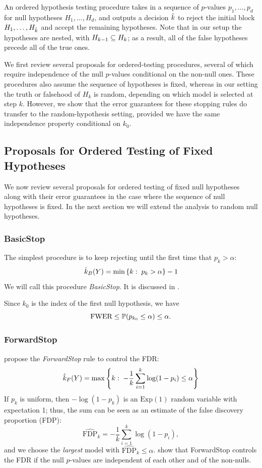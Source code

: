\documentclass{article}
\begin{document}
An ordered hypothesis testing procedure takes in a sequence of $p$-values $p_1, \ldots, p_d$ for null hypotheses $H_{1}, \ldots, H_{d}$, and outputs a decision $\hk$ to reject the initial block $H_{1}, \ldots, H_{\hk}$ and accept the remaining hypotheses. Note that in our setup the hypotheses are nested, with $H_{k-1} \sub H_k$; as a result, all of the false hypotheses precede all of the true ones.

We first review several proposals for ordered-testing procedures, several of which require independence of the null $p$-values conditional on the non-null ones. These procedures also assume the sequence of hypotheses is fixed, whereas in our setting the truth or falsehood of $H_k$ is random, depending on which model is selected at step $k$. However, we show that the error guarantees for these stopping rules do transfer to the random-hypothesis setting, provided we have the same independence property conditional on $k_0$.

\subsection{Proposals for Ordered Testing of Fixed Hypotheses}
\label{sec:orderedProposals}

We now review several proposals for ordered testing of fixed null hypotheses along with their error guarantees in the case where the sequence of null hypotheses is fixed. In the next section we will extend the analysis to random null hypotheses.

\subsubsection{BasicStop}
The simplest procedure is to keep rejecting until the first time that $p_k > \alpha$: 
\[
\hk_B(Y) = \min\left\{k:\; p_k > \alpha\right\} - 1
\]
We will call this procedure {\em BasicStop}. It is discussed in \citet{marcus1976}.

Since $k_0$ is the index of the first null hypothesis, we have
\begin{equation}\label{eq:basic-stop-control}
 \text{FWER} \leq \P(p_{k_0} \leq \alpha) \leq \alpha.
\end{equation}

\subsubsection{ForwardStop}

\citet{gsell2013sequential} propose the {\em ForwardStop} rule to control the FDR:
\[
  \hk_{F}(Y) = \max\left\{k:\;
    -\frac{1}{k}\sum_{i=1}^k \log(1-p_i) \leq \alpha\right\}
\]
If $p_k$ is uniform, then $-\log(1-p_k)$ is an $\text{Exp}(1)$ random variable with expectation 1; thus, the sum can be seen as an estimate of the false discovery proportion (FDP):
\[
\widehat{\text{FDP}}_k = -\frac{1}{k}\sum_{i=1}^k \log(1-p_i),
\]
and we choose the {\em largest} model with $\widehat{\text{FDP}}_k \leq \alpha$. \citet{gsell2013sequential} show that ForwardStop controls the FDR if the null $p$-values are independent of each other and of the non-nulls.
\end{document}
